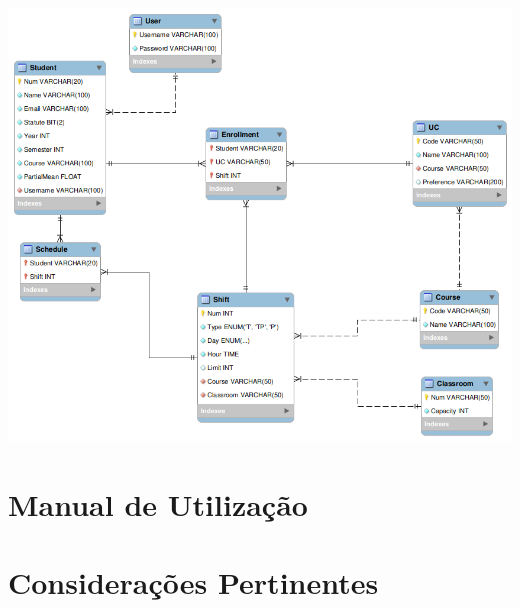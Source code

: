 \documentclass[a4paper,12pt]{scrreprt}
\begin{document}
\begin{minipage}{\textwidth}
    \centering
    \includegraphics[width=1\textwidth]{images/SchedulePlanner_db.png}
    \label{fig:9-1-base_de_dados_do_sistema}
\end{minipage}




\chapter{Manual de Utilização}



\chapter{Considerações Pertinentes}
\vspace{1cm}
\end{document}

